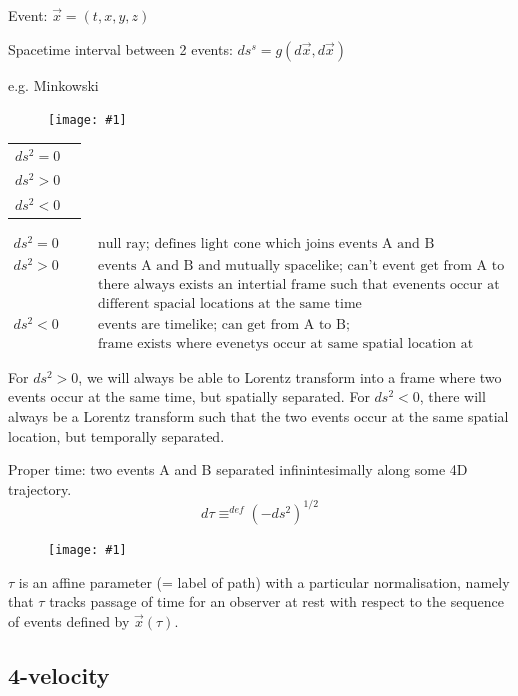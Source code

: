 \documentclass[a4paper]{article} %
\renewcommand{\picture}[1]
{
\begin{figure}[h]
\centering
\texttt{[image: \#1]}
\end{figure}
}
\begin{document}
Event: $\vec{x}=(t,x,y,z)$

Spacetime interval between 2 events: $ds^s=g(d\vec{x},d\vec{x})$

e.g. Minkowski

\picture{images/lightcone.png}

\begin{table}[h]
\centering
\begin{tabular}{l l}
$ds^2=0$ & \\
$ds^2>0$ & \\
$ds^2<0$ & 
\end{tabular}
\end{table}

\begin{align*}
ds^2=0\qquad &\text{null ray; defines light cone which joins events A and B}\\
ds^2>0\qquad &\text{events A and B and mutually spacelike; can't event get from A to B;}\\
\qquad&\text{there always exists an intertial frame such that evenents occur at}\\
\qquad&\text{different spacial locations at the same time}\\
ds^2<0 \qquad& \text{events are timelike; can get from A to B;}\\
\qquad &\text{frame exists where evenetys occur at same spatial location at different times}
\end{align*}

For $ds^2>0$, we will always be able to Lorentz transform into a frame where two events occur at the same time, but spatially separated. For $ds^2<0$, there will always be a Lorentz transform such that the two events occur at the same spatial location, but temporally separated.

Proper time: two events A and B separated infinintesimally along some 4D trajectory.
\begin{equation}
d\tau \equiv^{def}(-ds^2)^{1/2}
\end{equation}

\picture{images/propertime_path}


$\tau$ is an affine parameter (= label of path) with a particular normalisation, namely that $\tau$ tracks passage of time for an observer at rest with respect to the sequence of events defined by $\vec{x}(\tau)$.

\subsection{4-velocity}
\end{document}
